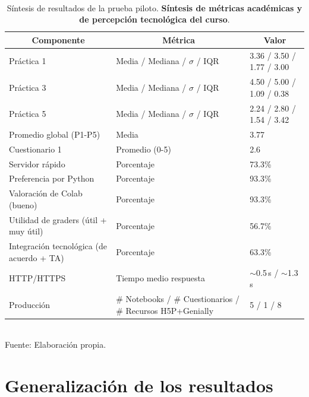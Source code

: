 \documentclass[letter,oneside,12pt,spanish]{report}
\begin{document}
\begin{table}[h!]
	\centering
	\caption{ \\ \vspace{0.5cm} Síntesis de resultados de la prueba piloto. \textbf{Síntesis de métricas académicas y de percepción tecnológica del curso}.}
	\label{tab:metricas}
	\renewcommand{\arraystretch}{1.3}
	\begin{tabular}{|p{5cm}|p{5.5cm}|p{4.5cm}|} 
		\hline
		\multicolumn{1}{|c|}{\textbf{Componente}} & 
		\multicolumn{1}{c|}{\textbf{Métrica}} & 
		\multicolumn{1}{c|}{\textbf{Valor}} \\
		\hline
		Práctica 1 & Media / Mediana / $\sigma$ / IQR & 3.36 / 3.50 / 1.77 / 3.00 \\
		\hline
		Práctica 3 & Media / Mediana / $\sigma$ / IQR & 4.50 / 5.00 / 1.09 / 0.38 \\
		\hline
		Práctica 5 & Media / Mediana / $\sigma$ / IQR & 2.24 / 2.80 / 1.54 / 3.42 \\
		\hline
		Promedio global (P1-P5) & Media & 3.77 \\
		\hline
		Cuestionario 1 & Promedio (0-5) & 2.6 \\
		\hline
		Servidor rápido & Porcentaje & 73.3\% \\
		\hline
		Preferencia por Python & Porcentaje & 93.3\% \\
		\hline
		Valoración de Colab (bueno) & Porcentaje & 93.3\% \\
		\hline
		Utilidad de graders (útil + muy útil) & Porcentaje & 56.7\% \\
		\hline
		Integración tecnológica (de acuerdo + TA) & Porcentaje & 63.3\% \\
		\hline
		HTTP/HTTPS & Tiempo medio respuesta & $\sim$0.5\,s / $\sim$1.3\,s \\
		\hline
		Producción & \# Notebooks / \# Cuestionarios / \# Recursos H5P+Genially & 5 / 1 / 8 \\
		\hline
	\end{tabular}
	\vspace{0.5cm}
	\\Fuente: Elaboración propia.
\end{table}

\section{Generalización de los resultados}
\end{document}
